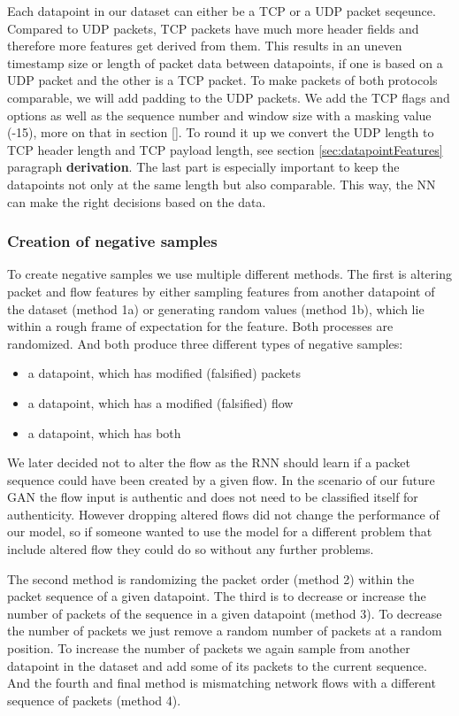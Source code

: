 \documentclass[
	ngerman,
	ruledheaders=section,%
	class=report,%
	thesis={type=bachelor},%
	accentcolor=9c,%
	custommargins=true,%
	marginpar=false,%
	parskip=half-,%
	fontsize=11pt,%
]{tudapub}
\begin{document}
Each datapoint in our dataset can either be a TCP or a UDP packet seqeunce.
Compared to UDP packets, TCP packets have much more header fields and therefore more features get derived from them.
This results in an uneven timestamp size or length of packet data between datapoints, if one is based on a UDP packet and the other is a TCP packet.
To make packets of both protocols comparable, we will add padding to the UDP packets.
We add the TCP flags and options as well as the sequence number and window size with a masking value (-15), more on that in section \ref{}.
To round it up we convert the UDP length to TCP header length and TCP payload length, see section \ref{sec:datapointFeatures} paragraph \textbf{derivation}.
The last part is especially important to keep the datapoints not only at the same length but also comparable.
This way, the NN can make the right decisions based on the data.

\subsubsection{Creation of negative samples}
\label{sec:negativeSamples}

To create negative samples we use multiple different methods.
The first is altering packet and flow features by either sampling features from another datapoint of the dataset (method 1a) or generating random values (method 1b), which lie within a rough frame of expectation for the feature.
Both processes are randomized.
And both produce three different types of negative samples:

\begin{itemize}
    \item a datapoint, which has modified (falsified) packets
    \item a datapoint, which has a modified (falsified) flow
    \item a datapoint, which has both
\end{itemize}

We later decided not to alter the flow as the RNN should learn if a packet sequence could have been created by a given flow.
In the scenario of our future GAN the flow input is authentic and does not need to be classified itself for authenticity.
However dropping altered flows did not change the performance of our model, so if someone wanted to use the model for a different problem that include altered flow they could do so without any further problems.

The second method is randomizing the packet order (method 2) within the packet sequence of a given datapoint.
The third is to decrease or increase the number of packets of the sequence in a given datapoint (method 3).
To decrease the number of packets we just remove a random number of packets at a random position.
To increase the number of packets we again sample from another datapoint in the dataset and add some of its packets to the current sequence.
And the fourth and final method is mismatching network flows with a different sequence of packets (method 4).
\end{document}
